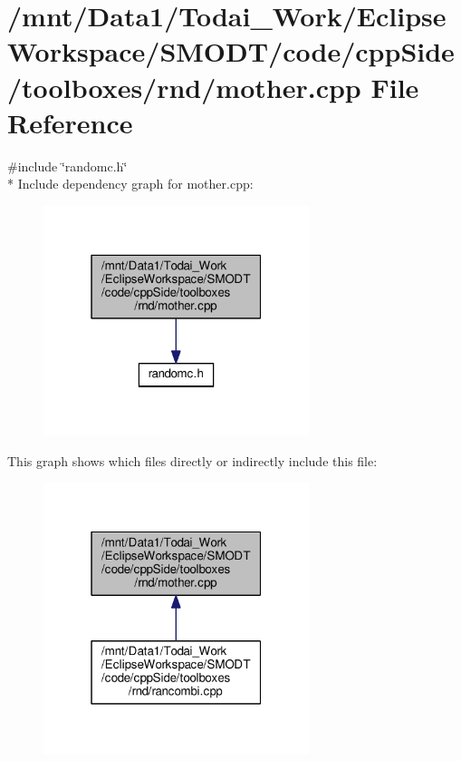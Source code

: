 \section{/mnt/\-Data1/\-Todai\-\_\-\-Work/\-Eclipse\-Workspace/\-S\-M\-O\-D\-T/code/cpp\-Side/toolboxes/rnd/mother.cpp File Reference}
\label{toolboxes_2rnd_2mother_8cpp}
{\ttfamily \#include \char`\"{}randomc.\-h\char`\"{}}\\*
Include dependency graph for mother.\-cpp\-:
\nopagebreak
\begin{figure}[H]
\begin{center}
\leavevmode
\includegraphics[width=220pt]{toolboxes_2rnd_2mother_8cpp__incl}
\end{center}
\end{figure}
This graph shows which files directly or indirectly include this file\-:
\nopagebreak
\begin{figure}[H]
\begin{center}
\leavevmode
\includegraphics[width=220pt]{toolboxes_2rnd_2mother_8cpp__dep__incl}
\end{center}
\end{figure}
